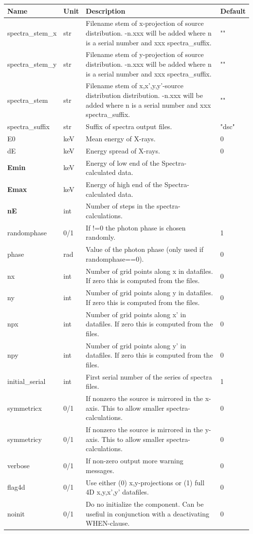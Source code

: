 \begin{longtable}{p{}p{}p{}p{}}
\toprule
\textbf{Name} & \textbf{Unit} & \textbf{Description} & \textbf{Default} \\
\midrule
\endhead
spectra\_stem\_x & str & Filename stem of x-projection of source distribution. -n.xxx will be added where n is a serial number and xxx spectra\_suffix. & "" \\
spectra\_stem\_y & str & Filename stem of y-projection of source distribution. -n.xxx will be added where n is a serial number and xxx spectra\_suffix. & "" \\
spectra\_stem & str & Filename stem of x,x',y,y'-source distribution distribution. -n.xxx will be added where n is a serial number and xxx spectra\_suffix. & "" \\
spectra\_suffix & str & Suffix of spectra output files. & "dsc" \\
E0 & keV & Mean energy of X-rays. & 0 \\
dE & keV & Energy spread of X-rays. & 0 \\
\textbf{Emin} & keV & Energy of low end of the Spectra-calculated data. &  \\
\textbf{Emax} & keV & Energy of high end of the Spectra-calculated data. &  \\
\textbf{nE} & int & Number of steps in the spectra-calculations. &  \\
randomphase & 0/1 & If !=0 the photon phase is chosen randomly. & 1 \\
phase & rad & Value of the photon phase (only used if randomphase==0). & 0 \\
nx & int & Number of grid points along x in datafiles. If zero this is computed from the files. & 0 \\
ny & int & Number of grid points along y in datafiles. If zero this is computed from the files. & 0 \\
npx & int & Number of grid points along x' in datafiles. If zero this is computed from the files. & 0 \\
npy & int & Number of grid points along y' in datafiles. If zero this is computed from the files. & 0 \\
initial\_serial & int & First serial number of the series of spectra files. & 1 \\
symmetricx & 0/1 & If nonzero the source is mirrored in the x-axis. This to allow smaller spectra-calculations. & 0 \\
symmetricy & 0/1 & If nonzero the source is mirrored in the y-axis. This to allow smaller spectra-calculations. & 0 \\
verbose & 0/1 & If non-zero output more warning messages. & 0 \\
flag4d & 0/1 & Use either (0) x,y-projections or (1) full 4D x,y,x',y' datafiles. & 0 \\
noinit & 0/1 & Do no initialize the component. Can be usefiul in conjunction with a deactivating WHEN-clause. & 0 \\
\bottomrule
\end{longtable}

